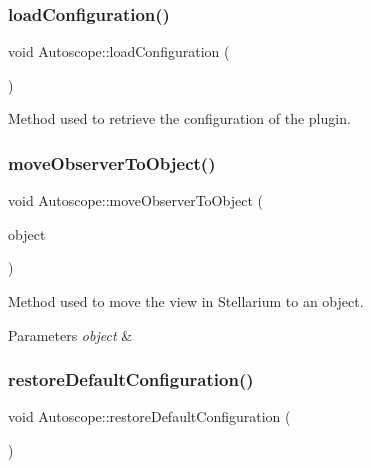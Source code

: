 \subsubsection{\texorpdfstring{loadConfiguration()}{loadConfiguration()}}
{\footnotesize\ttfamily void Autoscope\+::load\+Configuration (\begin{DoxyParamCaption}{ }\end{DoxyParamCaption})}



Method used to retrieve the configuration of the plugin. 

\mbox{\label{class_autoscope_ac8f9e09385739a5ba5ed460c83ec88df}} 
\subsubsection{\texorpdfstring{moveObserverToObject()}{moveObserverToObject()}}
{\footnotesize\ttfamily void Autoscope\+::move\+Observer\+To\+Object (\begin{DoxyParamCaption}\item[{Stel\+ObjectP}]{object }\end{DoxyParamCaption})}



Method used to move the view in Stellarium to an object. 


\begin{DoxyParams}{Parameters}
{\em object} & \\
\hline
\end{DoxyParams}
\mbox{\label{class_autoscope_a2c5424afe3270c6069e0109834dd52b5}} 
\subsubsection{\texorpdfstring{restoreDefaultConfiguration()}{restoreDefaultConfiguration()}}
{\footnotesize\ttfamily void Autoscope\+::restore\+Default\+Configuration (\begin{DoxyParamCaption}{ }\end{DoxyParamCaption})}



